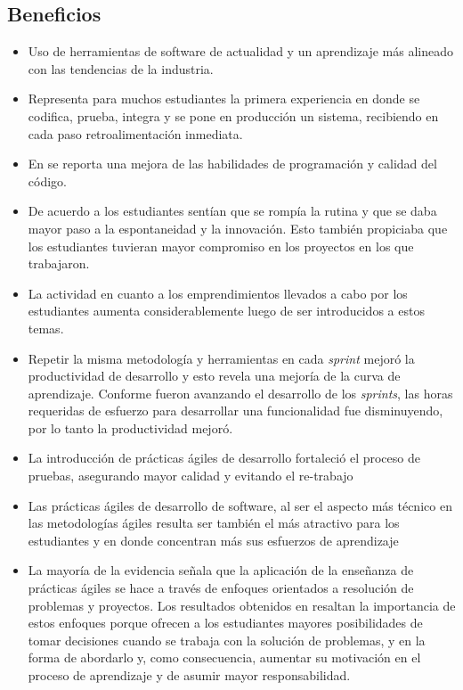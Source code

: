 \documentclass[journal]{IEEEtran}
\begin{document}
\subsection{Beneficios}
\begin{itemize}
    \item Uso de herramientas de software de actualidad y un aprendizaje más alineado con las tendencias de la industria\cite{cenfotec-2}.
    \item Representa para muchos estudiantes la primera experiencia en donde se codifica, prueba, integra y se pone en producción un sistema, recibiendo en cada paso retroalimentación inmediata\cite{kropp-meier-2}.
    \item En \cite{kropp-meier-1} se reporta una mejora de las habilidades de programación y calidad del código.
    \item De acuerdo a \cite{scharlau} los estudiantes sentían que se rompía la rutina y que se daba mayor paso a la espontaneidad y la innovación. Esto también propiciaba que los estudiantes tuvieran mayor compromiso en los proyectos en los que trabajaron.
    \item La actividad en cuanto a los emprendimientos llevados a cabo por los estudiantes aumenta considerablemente luego de ser introducidos a estos temas\cite{hickey-salas}.
    \item Repetir la misma metodología y herramientas en cada \emph{sprint} mejoró la productividad de desarrollo y esto revela una mejoría de la curva de aprendizaje. Conforme fueron avanzando el desarrollo de los \emph{sprints}, las horas requeridas de esfuerzo para desarrollar una funcionalidad fue disminuyendo, por lo tanto la productividad mejoró\cite{salazar}.
    \item La introducción de prácticas ágiles de desarrollo fortaleció el proceso de pruebas, asegurando mayor calidad y evitando el re-trabajo\cite{salazar}
    \item Las prácticas ágiles de desarrollo de software, al ser el aspecto más técnico en las metodologías ágiles resulta ser también el más atractivo para los estudiantes y en donde concentran más sus esfuerzos de aprendizaje\cite{steghoger-et-al}
    \item La mayoría de la evidencia señala que la aplicación de la enseñanza de prácticas ágiles se hace a través de enfoques orientados a resolución de problemas y proyectos. Los resultados obtenidos en \cite{mora-et-al-1} resaltan la importancia de estos enfoques porque ofrecen a los estudiantes mayores posibilidades de tomar decisiones cuando se trabaja con la solución de problemas, y en la forma de abordarlo y, como consecuencia, aumentar su motivación en el proceso de aprendizaje y de asumir mayor responsabilidad.

\end{itemize}
\end{document}
